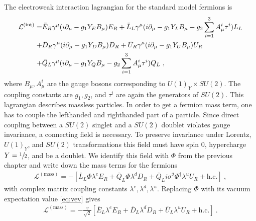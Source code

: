 The electroweak interaction lagrangian for the standard model fermions is
\begin{align}\label{eq:LFermion}
	\mathcal{L}^{(\text{int})} = &\bar{E}_R\gamma^\mu(i\partial_\mu-g_1Y_EB_\mu)E_R + \bar{L}_L\gamma^\mu(i\partial_\mu-g_1Y_LB_\mu-g_2\sum_{i=1}^{3}A_\mu^i\tau^i)L_L \notag \\
	+ &\bar{D}_R\gamma^\mu(i\partial_\mu-g_1Y_DB_\mu)D_R + \bar{U}_R\gamma^\mu(i\partial_\mu-g_1Y_UB_\mu)U_R \notag \\
	+ &\bar{Q}_L\gamma^\mu(i\partial_\mu-g_1Y_QB_\mu-g_2\sum_{i=1}^{3}A_\mu^i\tau^i)Q_L \ ,
\end{align}
where $B_\mu, A_\mu^i$ are the gauge bosons corresponding to $U(1)_Y\times SU(2)$. The coupling constants are $g_1,g_2$, and $\tau^i$ are again the generators of $SU(2)$. This lagrangian describes massless particles. In order to get a fermion mass term, one has to couple the lefthanded and righthanded part of a particle. Since direct coupling between a $SU(2)$ singlet and a $SU(2)$ doublet violates gauge invariance, a connecting field is necessary. To preserve invariance under Lorentz, $U(1)_Y$, and $SU(2)$ transformations this field must have spin 0, hypercharge $Y=\sfrac{1}{2}$, and be a doublet. We identify this field with $\Phi$ from the previous chapter and write down the mass terms for the fermions
\begin{align}
	\mathcal{L}^{(\text{mass})} = -\left[\bar{L}_L\Phi\lambda^e  E_R  + \bar{Q}_L\Phi\lambda^d D_R + \bar{Q}_Li\sigma^2\Phi^\dagger\lambda^u U_R + \text{h.c.}\right] \ ,
\end{align}
with complex matrix coupling constants $\lambda^e,\lambda^d,\lambda^u$. Replacing $\Phi$ with its vacuum expectation value \eqref{eq:vev} gives
\begin{align}\label{eq:LMass}
	\mathcal{L}^{(\text{mass})} = -\frac{v}{\sqrt{2}}\left[ \bar{E}_L\lambda^e E_R  + \bar{D}_L \lambda^dD_R + \bar{U}_L\lambda^u U_R + \text{h.c.}\right] \ .
\end{align}



